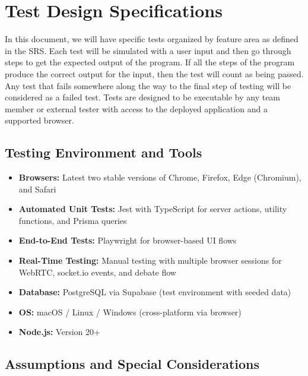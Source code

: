 \documentclass[12pt]{article}
\begin{document}
\section{Test Design Specifications}

In this document, we will have specific tests organized by feature area as defined in the SRS. Each test will be simulated with a user input and then go through steps to get the expected output of the program. If all the steps of the program produce the correct output for the input, then the test will count as being passed. Any test that fails somewhere along the way to the final step of testing will be considered as a failed test. Tests are designed to be executable by any team member or external tester with access to the deployed application and a supported browser.

\subsection{Testing Environment and Tools}

\begin{itemize}
    \item \textbf{Browsers:} Latest two stable versions of Chrome, Firefox, Edge (Chromium), and Safari
    \item \textbf{Automated Unit Tests:} Jest with TypeScript for server actions, utility functions, and Prisma queries
    \item \textbf{End-to-End Tests:} Playwright for browser-based UI flows
    \item \textbf{Real-Time Testing:} Manual testing with multiple browser sessions for WebRTC, socket.io events, and debate flow
    \item \textbf{Database:} PostgreSQL via Supabase (test environment with seeded data)
    \item \textbf{OS:} macOS / Linux / Windows (cross-platform via browser)
    \item \textbf{Node.js:} Version 20+
\end{itemize}

\subsection{Assumptions and Special Considerations}
\end{document}
